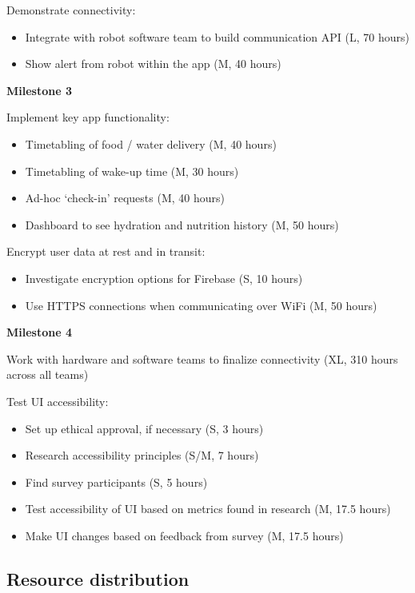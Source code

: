 \documentclass{article}
\begin{document}
Demonstrate connectivity:
\begin{itemize}
\item Integrate with robot software team to build communication API (L, 70 hours)
\item Show alert from robot within the app (M, 40 hours)
\end{itemize}

{\bf Milestone 3}

Implement key app functionality:
\begin{itemize}
\item Timetabling of food / water delivery (M, 40 hours)
\item Timetabling of wake-up time (M, 30 hours)
\item Ad-hoc `check-in' requests (M, 40 hours)
\item Dashboard to see hydration and nutrition history (M, 50 hours)
\end{itemize}

Encrypt user data at rest and in transit:
\begin{itemize}
\item Investigate encryption options for Firebase (S, 10 hours)
\item Use HTTPS connections when communicating over WiFi (M, 50 hours)
\end{itemize}

{\bf Milestone 4}

Work with hardware and software teams to finalize connectivity (XL, 310 hours across all teams)

Test UI accessibility:
\begin{itemize}
\item Set up ethical approval, if necessary (S, 3 hours)
\item Research accessibility principles (S/M, 7 hours)
\item Find survey participants (S, 5 hours)
\item Test accessibility of UI based on metrics found in research (M, 17.5 hours)
\item Make UI changes based on feedback from survey (M, 17.5 hours)
\end{itemize}

\subsection{Resource distribution}
\end{document}
